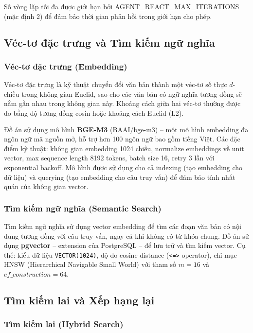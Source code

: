 Số vòng lặp tối đa được giới hạn bởi AGENT\_REACT\_MAX\_ITERATIONS (mặc định 2) để đảm bảo thời gian phản hồi trong giới hạn cho phép.

\subsection{Véc-tơ đặc trưng và Tìm kiếm ngữ nghĩa}

\subsubsection*{Véc-tơ đặc trưng (Embedding)}

Véc-tơ đặc trưng là kỹ thuật chuyển đổi văn bản thành một véc-tơ số thực $d$-chiều trong không gian Euclid, sao cho các văn bản có ngữ nghĩa tương đồng sẽ nằm gần nhau trong không gian này. Khoảng cách giữa hai véc-tơ thường được đo bằng độ tương đồng cosin hoặc khoảng cách Euclid (L2).

Đồ án sử dụng mô hình \textbf{BGE-M3} (BAAI/bge-m3) -- một mô hình embedding đa ngôn ngữ mã nguồn mở, hỗ trợ hơn 100 ngôn ngữ bao gồm tiếng Việt. Các đặc điểm kỹ thuật: không gian embedding 1024 chiều, normalize embeddings về unit vector, max sequence length 8192 tokens, batch size 16, retry 3 lần với exponential backoff. Mô hình được sử dụng cho cả indexing (tạo embedding cho dữ liệu) và querying (tạo embedding cho câu truy vấn) để đảm bảo tính nhất quán của không gian vector.

\subsubsection*{Tìm kiếm ngữ nghĩa (Semantic Search)}

Tìm kiếm ngữ nghĩa sử dụng vector embedding để tìm các đoạn văn bản có nội dung tương đồng với câu truy vấn, ngay cả khi không có từ khóa chung. Đồ án sử dụng \textbf{pgvector} -- extension của PostgreSQL -- để lưu trữ và tìm kiếm vector. Cụ thể: kiểu dữ liệu \texttt{VECTOR(1024)}, độ đo cosine distance (\texttt{<=>} operator), chỉ mục HNSW (Hierarchical Navigable Small World) với tham số $m = 16$ và $ef\_construction = 64$.

\subsection{Tìm kiếm lai và Xếp hạng lại}

\subsubsection*{Tìm kiếm lai (Hybrid Search)}

